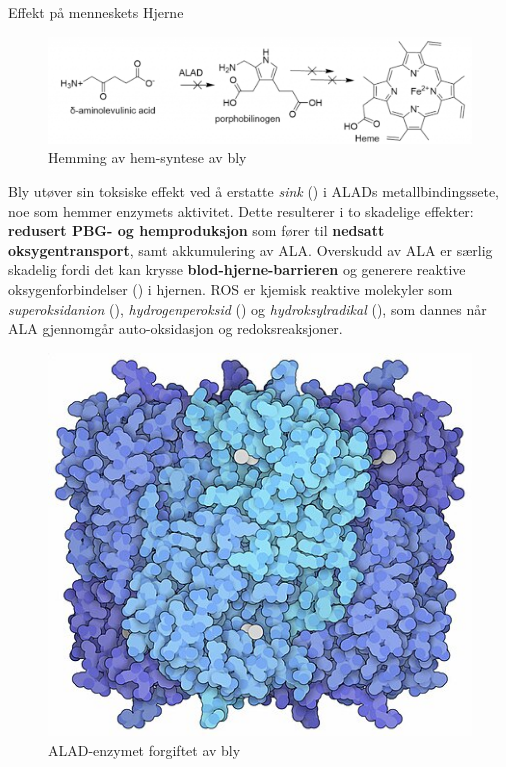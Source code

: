 \documentclass[final]{beamer}
\newlength{\colwidth}
\begin{document}
\begin{frame}[t]
\begin{columns}[t]
\begin{column}{\colwidth}
\begin{block}{Effekt på menneskets Hjerne}
				\begin{figure}[h!]
					\centering
					\vspace{0.5cm}
					\hspace{-3cm}
					\includegraphics[width=16cm]{./assets/heme_synthesis.png}
					\caption{Hemming av hem-syntese av bly}
				\end{figure}
				\vspace{0.2cm}

				Bly utøver sin toksiske effekt ved å erstatte \textit{sink} () i ALADs
				metallbindingssete, noe som hemmer enzymets aktivitet. Dette resulterer i to skadelige
				effekter: \textbf{redusert PBG- og hemproduksjon} som fører til \textbf{nedsatt
					oksygentransport}, samt akkumulering av ALA. Overskudd av ALA er særlig skadelig fordi det
				kan krysse \textbf{blod-hjerne-barrieren} og generere reaktive oksygenforbindelser
				() i hjernen. ROS er kjemisk reaktive molekyler som \textit{superoksidanion}
				(), \textit{hydrogenperoksid} () og \textit{hydroksylradikal}
				(), som dannes når ALA gjennomgår auto-oksidasjon og redoksreaksjoner.

				\begin{figure}[h!]
					\centering
					\vspace{0.5cm}
					\includegraphics[width=12cm]{./assets/ALAD_poisoned_by_lead_ions.jpg}
					\caption{ALAD-enzymet forgiftet av bly}
				\end{figure}
				\vspace{0.5cm}


\end{block}
\end{column}
\end{columns}
\end{frame}
\end{document}
